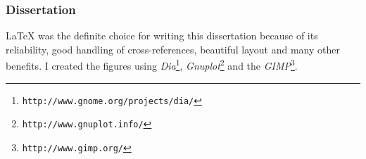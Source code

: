 \subsubsection{Dissertation}
\LaTeX{} was the definite choice for writing this dissertation because of its reliability,
good handling of cross-references, beautiful layout and many other benefits. I created the
figures using \textsl{Dia}\footnote{\texttt{http://www.gnome.org/projects/dia/}},
\textsl{Gnuplot}\footnote{\texttt{http://www.gnuplot.info/}} and the
\textsl{GIMP}\footnote{\texttt{http://www.gimp.org/}}.
